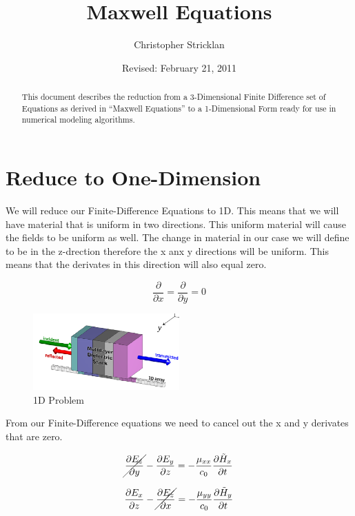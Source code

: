 \documentclass[a4paper,10pt]{article}
\title{Maxwell Equations}
\author{Christopher Stricklan}
\date{Revised: February 21, 2011}
\begin{document}
\maketitle

\begin{abstract}
This document describes the reduction from a 3-Dimensional Finite Difference set of Equations as derived in ``Maxwell Equations'' to a 1-Dimensional Form ready for use in numerical modeling algorithms.
\end{abstract}

\vfill



\section{Reduce to One-Dimension}

We will reduce our Finite-Difference Equations to 1D.  This means that we will have material that is uniform in two directions.  
This uniform material will cause the fields to be uniform as well.  The change in material in our case we will define to be in the z-drection therefore the x anx y directions
will be uniform.  This means that the derivates in this direction will also equal zero.

\begin{equation*}
 \frac{\partial}{\partial x} = \frac{\partial}{\partial y}=0
\end{equation*}

\begin{figure}[h]
  \centering
    \includegraphics[width=0.5\textwidth]{Slabs1D.png}
  \caption{1D Problem}
\end{figure}


From our Finite-Difference equations we need to cancel out the x and y derivates that are zero.


\begin{equation*}
  \cancel{\frac{\partial E_z}{\partial y}} - \frac{\partial E_y}{\partial z} = -\frac{\mu_{xx}}{c_0}\frac{\partial\tilde{H}_x}{\partial t}
\end{equation*}

\begin{equation*}
  \frac{\partial E_x}{\partial z} - \cancel{\frac{\partial E_z}{\partial x}} = -\frac{\mu_{yy}}{c_0}\frac{\partial\tilde{H}_y}{\partial t}
\end{equation*}
\end{document}
